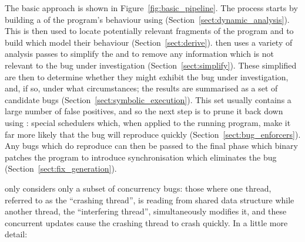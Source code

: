 The basic approach is shown in Figure~\ref{fig:basic_pipeline}.  The
process starts by building a
 of the program's behaviour using  (Section~\ref{sect:dynamic_analysis}).  This
 is then used to locate potentially relevant fragments
of the program and to build {\StateMachines} which model their
behaviour (Section~\ref{sect:derive}).  {\Technique} then uses a
variety of analysis passes to simplify the {\StateMachines} and to
remove any information which is not relevant to the bug under
investigation (Section~\ref{sect:simplify}).  These simplified
{\StateMachines} are then  to determine
whether they might exhibit the bug under investigation, and, if so,
under what circumstances; the results are summarised as a set of
candidate bugs (Section~\ref{sect:symbolic_execution}).  This set
usually contains a large number of false positives, and so the next
step is to prune it back down using : special
schedulers which, when applied to the running program, make it far
more likely that the bug will reproduce quickly
(Section~\ref{sect:bug_enforcers}).  Any bugs which do reproduce can
then be passed to the final  phase which
binary patches the program to introduce synchronisation which
eliminates the bug (Section~\ref{sect:fix_generation}).

{\Technique} only considers only a subset of concurrency bugs: those
where one thread, referred to as the ``crashing thread'', is reading
from shared data structure while another thread, the ``interfering
thread'', simultaneously modifies it, and these concurrent updates
cause the crashing thread to crash quickly.  In a little more detail:

